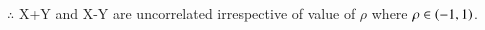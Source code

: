 $\therefore$ X+Y and X-Y are uncorrelated irrespective of value of $\rho$ where $\rho \in \left(-1,1\right)$.
